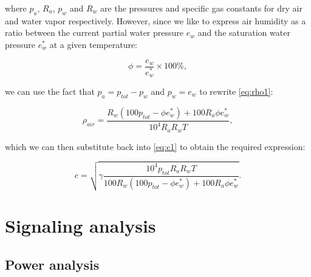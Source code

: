 \documentclass[11pt,titlepage]{report}
\begin{document}
\begin{appendices}
where $p_a$, $R_a$, $p_w$ and $R_w$ are the pressures and specific gas constants for dry air and water vapor respectively. However, since we like to express air humidity as a ratio between the current partial water pressure $e_w$ and the saturation water pressure $e^*_w$ at a given temperature:

\begin{equation}
	\phi = \frac{e_w}{e^*_w} \times 100\%,
\end{equation}

we can use the fact that $p_a = p_{tot} - p_w$ and $p_w = e_w$ to rewrite \ref{eq:rho1}:

\begin{equation} \label{eq:rho2}
	\rho_{air} = \frac{R_w(100 p_{tot} - \phi e^*_w) + 100 R_a \phi e^*_w}{10^4 R_a R_w T},
\end{equation}

which we can then substitute back into \ref{eq:c1} to obtain the required expression:

\begin{equation} \label{eq:c2}
	c = \sqrt{\gamma \frac{10^4 p_{tot} R_a R_w T}{100 R_w(100 p_{tot} - \phi e^*_w) + 100 R_a \phi e^*_w}}.
\end{equation}
\cite{sengpiel-sound-speed,uiuc-rel-humid,wikipedia-speed-of-sound}

\newcommand{\E}[1]{\operatorname{E}\left[#1\right]}
\newcommand{\Prob}[1]{\operatorname{P}\left[#1\right]}
\newcommand{\PSD}[1]{\operatorname{PSD}\left\{#1\right\}}
\let\F\Fold
\newcommand{\F}[1]{\mathcal{F}\left\{#1\right\}}
\newcommand{\Var}[1]{\operatorname{Var}\left[#1\right]}

\chapter{Signaling analysis}
\label{app:sig-an}


\section{Power analysis}

\end{appendices}
\end{document}
